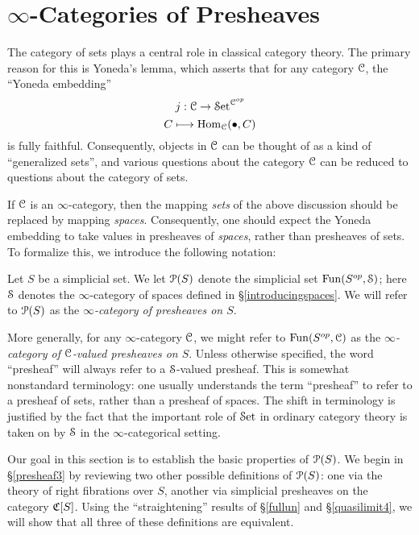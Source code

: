 \section{$\infty$-Categories of Presheaves}\label{c5s1}

\setcounter{theorem}{0}

The category of sets plays a central role in classical category theory. The primary reason for this is Yoneda's lemma, which asserts that for any category $\operatorname{\mathcal{C}}$, the ``Yoneda embedding''
$$j: \operatorname{\mathcal{C}} \rightarrow \operatorname{\mathcal{S}et}^{\operatorname{\mathcal{C}}^{op}}$$
$$ C \longmapsto \operatorname{Hom}_{\operatorname{\mathcal{C}}}(\bullet, C)$$
is fully faithful. Consequently, objects in $\operatorname{\mathcal{C}}$ can be thought of as a kind of ``generalized sets'', and various questions about the category $\operatorname{\mathcal{C}}$ can be reduced to questions about the category of sets.

If $\operatorname{\mathcal{C}}$ is an $\infty$-category, then the mapping {\em sets} of the above discussion should be replaced by mapping {\em spaces}. Consequently, one should expect the Yoneda embedding to take values in presheaves of {\em spaces}, rather than presheaves of sets. To formalize this, 
we introduce the following notation:

\begin{definition}
Let $S$ be a simplicial set. We let $\operatorname{\mathcal{P}}(S)$ denote the simplicial set
$\operatorname{Fun}(S^{op}, \operatorname{\mathcal{S}})$; here $\operatorname{\mathcal{S}}$ denotes the $\infty$-category of spaces defined in \S \ref{introducingspaces}. We will refer
to $\operatorname{\mathcal{P}}(S)$ as the {\it $\infty$-category of presheaves on $S$}.
\end{definition}

\begin{remark}
More generally, for any $\infty$-category $\operatorname{\mathcal{C}}$, we might refer to
$\operatorname{Fun}( S^{op}, \operatorname{\mathcal{C}})$ as the {\it $\infty$-category of $\operatorname{\mathcal{C}}$-valued presheaves on $S$}. 
Unless otherwise specified, the word ``presheaf'' will always refer to a $\operatorname{\mathcal{S}}$-valued presheaf.
This is somewhat nonstandard terminology: one usually understands
the term ``presheaf'' to refer to a presheaf of sets, rather than
a presheaf of spaces. The shift in terminology is justified by the
fact that the important role of $\operatorname{\mathcal{S}et}$ in ordinary category theory
is taken on by $\operatorname{\mathcal{S}}$ in the $\infty$-categorical setting.
\end{remark}

Our goal in this section is to establish the basic properties of $\operatorname{\mathcal{P}}(S)$. We begin in \S \ref{presheaf3} by reviewing two other possible definitions of $\operatorname{\mathcal{P}}(S)$: one via the theory of right fibrations over $S$, another via simplicial presheaves on the category $\operatorname{\mathfrak{C}}[S]$. Using the ``straightening'' results of \S \ref{fullun} and \S \ref{quasilimit4}, we will show that all three of these definitions are equivalent.

